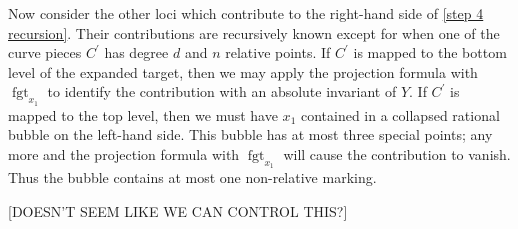 \documentclass[11pt]{amsart}
\newcommand{\fgt}{\operatorname{fgt}}
\theoremstyle{definition}
\theoremstyle{definition}
\begin{document}
Now consider the other loci which contribute to the right-hand side of \eqref{step 4 recursion}. Their contributions are recursively known except for when one of the curve pieces $C^\prime$ has degree $d$ and $n$ relative points. If $C^\prime$ is mapped to the bottom level of the expanded target, then we may apply the projection formula with $\fgt_{x_1}$ to identify the contribution with an absolute invariant of $Y$. If $C^\prime$ is mapped to the top level, then we must have $x_1$ contained in a collapsed rational bubble on the left-hand side. This bubble has at most three special points; any more and the projection formula with $\fgt_{x_1}$ will cause the contribution to vanish. Thus the bubble contains at most one non-relative marking.

[DOESN'T SEEM LIKE WE CAN CONTROL THIS?]


\newpage
\end{document}
